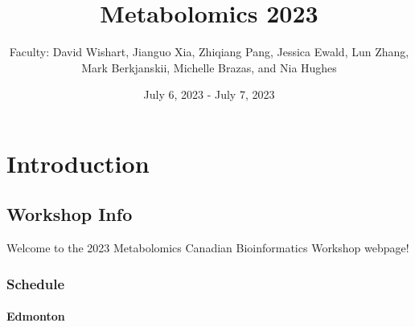 \documentclass[
]{book}
\title{Metabolomics 2023}
\author{Faculty: David Wishart, Jianguo Xia, Zhiqiang Pang, Jessica Ewald, Lun Zhang, Mark Berkjanskii, Michelle Brazas, and Nia Hughes}
\date{July 6, 2023 - July 7, 2023}
\begin{document}
\maketitle

{
\setcounter{tocdepth}{1}
\tableofcontents
}
\part{Introduction}\label{part-introduction}

\chapter{Workshop Info}\label{workshop-info}

Welcome to the 2023 Metabolomics Canadian Bioinformatics Workshop webpage!

\section{Schedule}\label{schedule}

\subsection{Edmonton}\label{edmonton}
\end{document}
